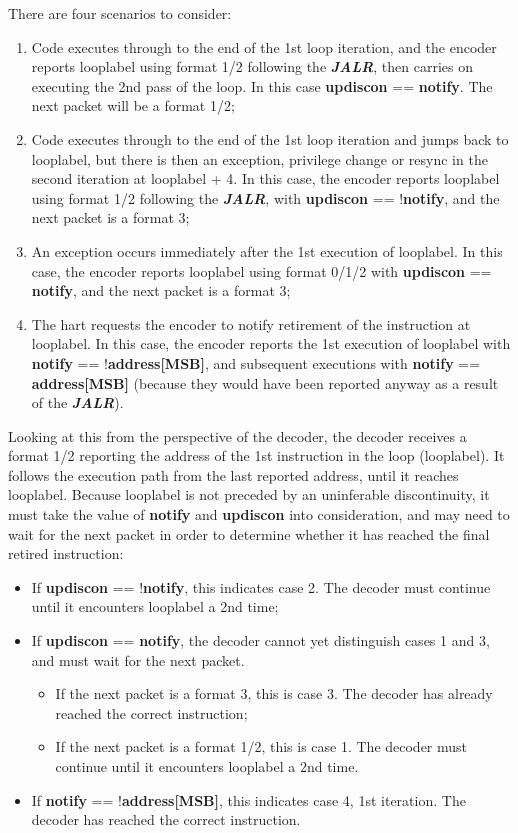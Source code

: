 There are four scenarios to consider:

\begin{enumerate}
  \item Code executes through to the end of the 1st loop iteration, and the encoder reports looplabel using format 1/2 following 
    the \textbf{\textit{JALR}}, then carries on executing the 2nd pass of the loop.  In this case \textbf{updiscon} == \textbf{notify}.  
    The next packet will be a format 1/2;
  \item Code executes through to the end of the 1st loop iteration and jumps back to looplabel, but there is then an exception, 
    privilege change or resync in the second iteration at looplabel + 4.  In this case, the encoder reports looplabel using 
    format 1/2 following the \textbf{\textit{JALR}}, with \textbf{updiscon} == !\textbf{notify}, and the next packet is a 
    format 3;
  \item An exception occurs immediately after the 1st execution of looplabel.  In this case, the encoder reports looplabel using 
    format 0/1/2 with \textbf{updiscon} == \textbf{notify}, and the next packet is a format 3;
  \item The hart requests the encoder to notify retirement of the instruction at looplabel.  In this case, the encoder reports the 1st 
    execution of looplabel with \textbf{notify} == !\textbf{address[MSB]}, and subsequent executions with \textbf{notify} == 
    \textbf{address[MSB]} (because they would have been reported anyway as a result of the \textbf{\textit{JALR}}).
\end{enumerate}

Looking at this from the perspective of the decoder, the decoder receives a format 1/2 reporting the address of the 1st instruction in the 
loop (looplabel).  It follows the execution path from the last reported address, until it reaches looplabel.  Because looplabel is not 
preceded by an uninferable discontinuity, it must take the value of \textbf{notify} and \textbf{updiscon} into consideration, and may need 
to wait for the next packet in order to determine whether it has reached the final retired instruction:
\begin{itemize}
  \item If \textbf{updiscon} == !\textbf{notify}, this indicates case 2.  The decoder must continue until it encounters 
    looplabel a 2nd time;
  \item If \textbf{updiscon} == \textbf{notify}, the decoder cannot yet distinguish cases 1 and 3, and must wait for the 
    next packet.
    \begin{itemize}
      \item If the next packet is a format 3, this is case 3.  The decoder has already reached the correct instruction;
      \item If the next packet is a format 1/2, this is case 1.  The decoder must continue until it encounters 
        looplabel a 2nd time.
    \end{itemize}
  \item If \textbf{notify} == !\textbf{address[MSB]}, this indicates case 4, 1st iteration.  The decoder has reached the 
    correct instruction.
\end{itemize}

